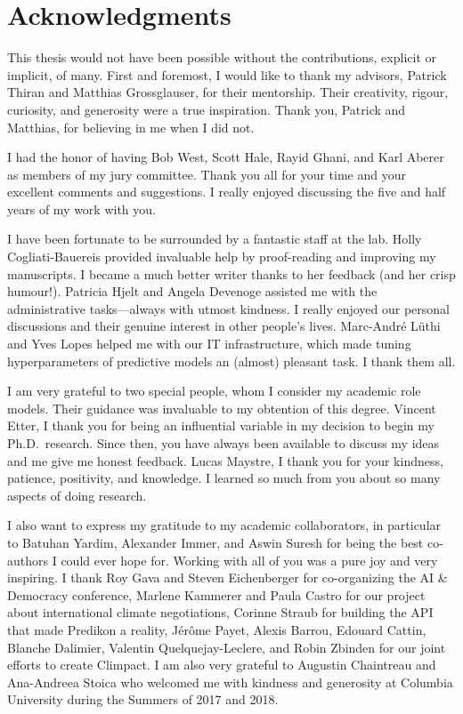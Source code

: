 \chapter*{Acknowledgments}

This thesis would not have been possible without the contributions, explicit or implicit, of many.
First and foremost, I would like to thank my advisors, Patrick Thiran and Matthias Grossglauser, for their mentorship.
Their creativity, rigour, curiosity, and generosity were a true inspiration.
Thank you, Patrick and Matthias, for believing in me when I did not.

I had the honor of having Bob West, Scott Hale, Rayid Ghani, and Karl Aberer as members of my jury committee.
Thank you all for your time and your excellent comments and suggestions.
I really enjoyed discussing the five and half years of my work with you.

I have been fortunate to be surrounded by a fantastic staff at the lab.
Holly Cogliati-Bauereis provided invaluable help by proof-reading and improving my manuscripts.
I became a much better writer thanks to her feedback (and her crisp humour!).
Patricia Hjelt and Angela Devenoge assisted me with the administrative tasks---always with utmost kindness.
I really enjoyed our personal discussions and their genuine interest in other people's lives.
Marc-André Lüthi and Yves Lopes helped me with our IT infrastructure, which made tuning hyperparameters of predictive models an (almost) pleasant task.
I thank them all.

I am very grateful to two special people, whom I consider my academic role models.
Their guidance was invaluable to my obtention of this degree.
Vincent Etter, I thank you for being an influential variable in my decision to begin my Ph.D.\ research.
Since then, you have always been available to discuss my ideas and me give me honest feedback.
Lucas Maystre, I thank you for your kindness, patience, positivity, and knowledge.
I learned so much from you about so many aspects of doing research.

I also want to express my gratitude to my academic collaborators, in particular to Batuhan Yardim, Alexander Immer, and Aswin Suresh for being the best co-authors I could ever hope for.
Working with all of you was a pure joy and very inspiring.
I thank Roy Gava and Steven Eichenberger for co-organizing the AI \& Democracy conference, Marlene Kammerer and Paula Castro for our project about international climate negotiations, Corinne Straub for building the API that made Predikon a reality, Jérôme Payet, Alexis Barrou, Edouard Cattin, Blanche Dalimier, Valentin Quelquejay-Leclere, and Robin Zbinden for our joint efforts to create Climpact.
I am also very grateful to Augustin Chaintreau and Ana-Andreea Stoica who welcomed me with kindness and generosity at Columbia University during the Summers of 2017 and 2018.

